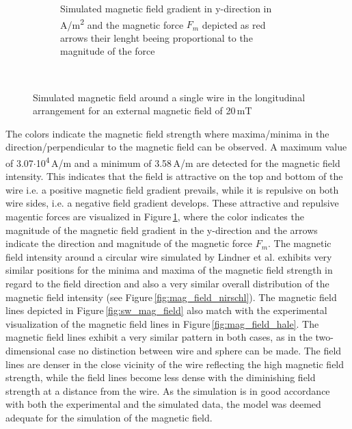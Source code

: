 \begin{figure}[H]
\begin{subfigure}{0.49\textwidth}
                \caption{Simulated magnetic field gradient in y-direction in A/m\textsuperscript{2} and the magnetic force $F_{m}$ depicted as red arrows their lenght beeing proportional to the magnitude of the force}\label{fig:mag_force_sw}
        \end{subfigure}
        \\
        
        \caption[Simulated magnetic field around a single wire]{Simulated magnetic field around a single wire in the longitudinal arrangement for an external magnetic field of 20\,mT}
        \label{fig:sw_fm_mag_field}
  \end{figure}

% 

The colors indicate the magnetic field strength where maxima/minima in the direction/perpendicular to the magnetic field can be observed. A maximum value of 3.07$\cdotp$10\textsuperscript{4}\,A/m and a minimum of 3.58\,A/m are detected for the magnetic field intensity. This indicates that the field is attractive on the top and bottom of the wire i.e. a positive magnetic field gradient prevails, while it is repulsive on both wire sides, i.e. a negative field gradient develops. These attractive and repulsive magentic forces are visualized in Figure\,\ref{fig:mag_force_sw}, where the color indicates the magnitude of the magnetic field gradient in the y-direction and the arrows indicate the direction and magnitude of the magnetic force $F_{m}$. The magnetic field intensity around a circular wire simulated by Lindner et al. \cite{lindner2013simulation} exhibits very similar positions for the minima and maxima of the magnetic field strength in regard to the field direction and also a very similar overall distribution of the magnetic field intensity (see Figure\,\ref{fig:mag_field_nirschl}). The magnetic field lines depicted in Figure\,\ref{fig:sw_mag_field} also match with the experimental visualization of the magnetic field lines in Figure\,\ref{fig:mag_field_hale}. The magnetic field lines exhibit a very similar pattern in both cases, as in the two-dimensional case no distinction between wire and sphere can be made. The field lines are denser in the close vicinity of the wire reflecting the high magnetic field strength, while the field lines become less dense with the diminishing field strength at a distance from the wire. As the simulation is in good accordance with both the experimental and the simulated data, the model was deemed adequate for the simulation of the magnetic field.  

